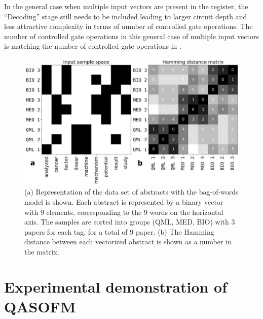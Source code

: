 \documentclass[pra,showkeys,twocolumn,showpacs]{revtex4-1}
\begin{document}
In the general case when multiple input vectors are present in the register, the ``Decoding'' stage still needs to be included leading to larger circuit depth and less attractive complexity in terms of number of controlled gate operations.
The number of controlled gate operations in this general case of multiple input vectors is matching the number of controlled gate operations in \cite{trugenberger2001}.  


\begin{figure}[t]
	\includegraphics[width=0.95\columnwidth]{vectorized_sample.png}
	\caption{
		(a) Representation of the data set of abstracts with the bag-of-words \cite{weikang2016} model is shown. 
		Each abstract is represented by a binary vector with 9 elements, corresponding to the 9 words on the horizontal axis. 
		The samples are sorted into groups (QML, MED, BIO) with 3 papers for each tag, for a total of 9 paper.    
		(b) The Hamming distance between each vectorized abstract is shown as a number in the matrix. 
	} 
	\label{fig:vectorized_sample}
\end{figure}



















\section{Experimental demonstration of QASOFM}
\end{document}
